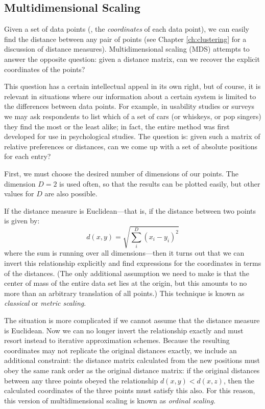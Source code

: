 \subsection{Multidimensional Scaling}


Given a set of data points (\ie, the \emph{coordinates} of each data
point), we can easily find the distance between any pair of points
(see Chapter \ref{ch:clustering} for a discussion of distance
measures). Multidimensional scaling (MDS) attempts to answer the
opposite question: given a distance matrix, can we recover the
explicit coordinates of the points?

This question has a certain intellectual appeal in its own right, but
of course, it is relevant in situations where our information about a
certain system is limited to the differences between data points.  For
example, in usability studies or surveys we may ask respondents to
list which of a set of cars (or whiskeys, or pop singers) they find
the most or the least alike; in fact, the entire method was first
developed for use in psychological studies. The question is: given
such a matrix of relative preferences or distances, can we come up
with a set of absolute positions for each entry?

First, we must choose the desired number of dimensions of our points.
The dimension $D=2$ is used often, so that the results can be plotted
easily, but other values for $D$ are also possible.

If the distance measure is Euclidean---that is, if the distance
between two points is given by:
%
\[
d( x, y ) = \sqrt{ \sum_i^D ( x_i - y_i )^2 }
\]
% 
where the sum is running over all dimensions---then it turns out that
we can invert this relationship explicitly and find expressions for
the coordinates in terms of the distances. (The only additional
assumption we need to make is that the center of mass of the entire
data set lies at the origin, but this amounts to no more than an
arbitrary translation of all points.) This technique is known as
\emph{classical} or \emph{metric scaling}.

The situation is more complicated if we cannot assume that the
distance measure is Euclidean. Now we can no longer invert the
relationship exactly and must resort instead to iterative
approximation schemes.\vadjust{\pagebreak} Because the resulting coordinates may not
replicate the original distances exactly, we include an additional
constraint: the distance matrix calculated from the new positions must
obey the same rank order as the original distance matrix: if the
original distances between any three points obeyed the relationship
$d(x,y) < d(x,z)$, then the calculated coordinates of the three points
must satisfy this also.  For this reason, this version of
multidimensional scaling is known as \emph{ordinal scaling}.


